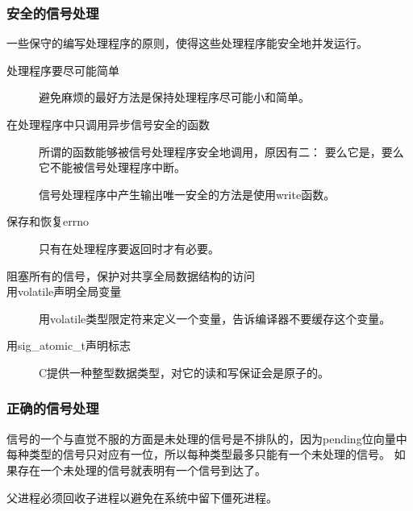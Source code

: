{{        \subsubsection{安全的信号处理}
        {
            一些保守的编写处理程序的原则，使得这些处理程序能安全地并发运行。

            \begin{description}
                \item[处理程序要尽可能简单] 避免麻烦的最好方法是保持处理程序尽可能小和简单。
                \item[在处理程序中只调用异步信号安全的函数]
                {
                    所谓的函数能够被信号处理程序安全地调用，原因有二：
                    要么它是，要么它不能被信号处理程序中断。

                    信号处理程序中产生输出唯一安全的方法是使用write函数。
                }
                \item[保存和恢复errno] 只有在处理程序要返回时才有必要。
                \item[阻塞所有的信号，保护对共享全局数据结构的访问]
                \item[用volatile声明全局变量] 用volatile类型限定符来定义一个变量，告诉编译器不要缓存这个变量。
                \item[用sig_atomic_t声明标志] C提供一种整型数据类型，对它的读和写保证会是原子的。
            \end{description}
        }

        \subsubsection{正确的信号处理}
        {
            信号的一个与直觉不服的方面是未处理的信号是不排队的，因为pending位向量中每种类型的信号只对应有一位，所以每种类型最多只能有一个未处理的信号。
            如果存在一个未处理的信号就表明有一个信号到达了。

            父进程必须回收子进程以避免在系统中留下僵死进程。
        }
    }
}
